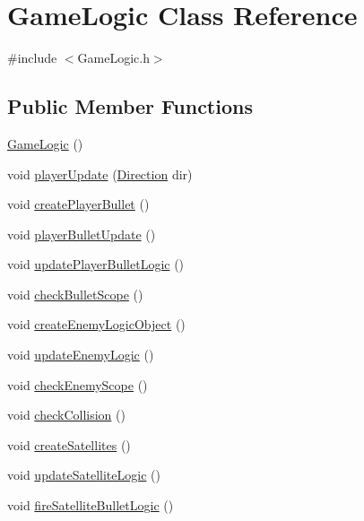 \hypertarget{class_game_logic}{}\section{Game\+Logic Class Reference}
\label{class_game_logic}


{\ttfamily \#include $<$Game\+Logic.\+h$>$}

\subsection*{Public Member Functions}
\begin{DoxyCompactItemize}
\item 
\hyperlink{class_game_logic_a996cd781691c36922e7ce792fcb21640}{Game\+Logic} ()
\item 
void \hyperlink{class_game_logic_a3bb909e55fc7c811aa0e3e6a92b881bb}{player\+Update} (\hyperlink{_game_common_data_8h_a224b9163917ac32fc95a60d8c1eec3aa}{Direction} dir)
\item 
void \hyperlink{class_game_logic_a05dec53eb3c36cf1a669c973fa0b16ae}{create\+Player\+Bullet} ()
\item 
void \hyperlink{class_game_logic_a2293e862afa9caa43ac1c21757b9c914}{player\+Bullet\+Update} ()
\item 
void \hyperlink{class_game_logic_abe02a85cda082eea7d0dc758d8fe3082}{update\+Player\+Bullet\+Logic} ()
\item 
void \hyperlink{class_game_logic_aa0800f256ffc094ee5373d372c26c2ea}{check\+Bullet\+Scope} ()
\item 
void \hyperlink{class_game_logic_ad88d3d16d008722d8a85449beb1ed589}{create\+Enemy\+Logic\+Object} ()
\item 
void \hyperlink{class_game_logic_a07cb8f8cb380fa2cd070aa30148a8ffd}{update\+Enemy\+Logic} ()
\item 
void \hyperlink{class_game_logic_a5c0dc59099b2e223c99fc4a4d51627f0}{check\+Enemy\+Scope} ()
\item 
void \hyperlink{class_game_logic_a2ff25304164107a3f4549f108db95a23}{check\+Collision} ()
\item 
void \hyperlink{class_game_logic_ab2b56581a56239bb837e6eeea0a2991d}{create\+Satellites} ()
\item 
void \hyperlink{class_game_logic_a7d3db89e4d9438756e01b203341dc7c0}{update\+Satellite\+Logic} ()
\item 
void \hyperlink{class_game_logic_ab84e34d803932a798b76f1c3b8a4af83}{fire\+Satellite\+Bullet\+Logic} ()
\item 

\end{DoxyCompactItemize}
